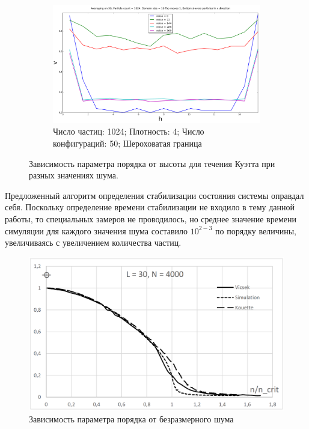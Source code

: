 \begin{figure}
\begin{subfigure}{\textwidth}
            \label{fig:Results:32kOld}
        \end{subfigure}
        \begin{subfigure}{\textwidth}
        \centering
            \includegraphics[height=0.3\textheight]{Images/1k_x50_NotMirror}
            \caption{Число частиц: 1024; Плотность: 4; Число конфигураций: 50; Шероховатая граница}
            \label{fig:Results:4kNew}
        \end{subfigure}
    \caption{Зависимость параметра порядка от высоты для течения Куэтта при разных значениях шума.}
    \label{fig:Results}
\end{figure}

Предложенный алгоритм определения стабилизации состояния системы оправдал себя. Поскольку определение времени стабилизации не входило в тему данной работы, то специальных замеров не проводилось, но среднее значение времени симуляции для каждого значения шума составило $10^{2-3}$ по порядку величины, увеличиваясь с увеличением количества частиц.

\begin{figure}
    \centering
        \includegraphics[height=0.33\textheight]{Images/CheckerResult}
    \caption{Зависимость параметра порядка от безразмерного шума}
    \label{fig:CheckerResults}
\end{figure}


